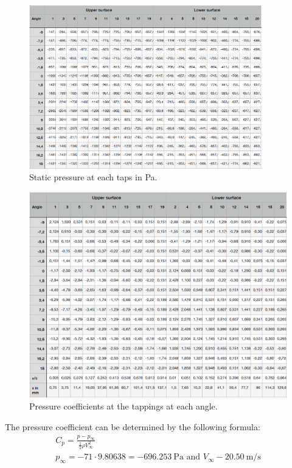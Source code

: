 \documentclass[11pt]{article}
\numberwithin{equation}{section}
\begin{document}
\begin{figure}[H]
  \centering
  \includegraphics[width=0.9\textwidth]{./img/diagram8.png}
  \caption{Static pressure at each taps in \si{\pascal}.}
  \label{staticpressure}
\end{figure}
\begin{figure}[H]
  \centering
  \includegraphics[width=\textwidth]{./img/diagram9.png}
  \caption{Pressure coefficients at the tappings at each angle.}
\end{figure}
The pressure coefficient can be determined by the following formula:
\begin{gather}
  C_p = \frac{p - p_{\infty}}{\frac{1}{2}\rho V_{\infty}^2}\\
  p_{\infty} = -71\cdot 9.80638 = \SI{-696.253}{\pascal} \textrm{ and } V_{\infty} - \SI{20.50}{\meter\per\second}
\end{gather}
\end{document}
